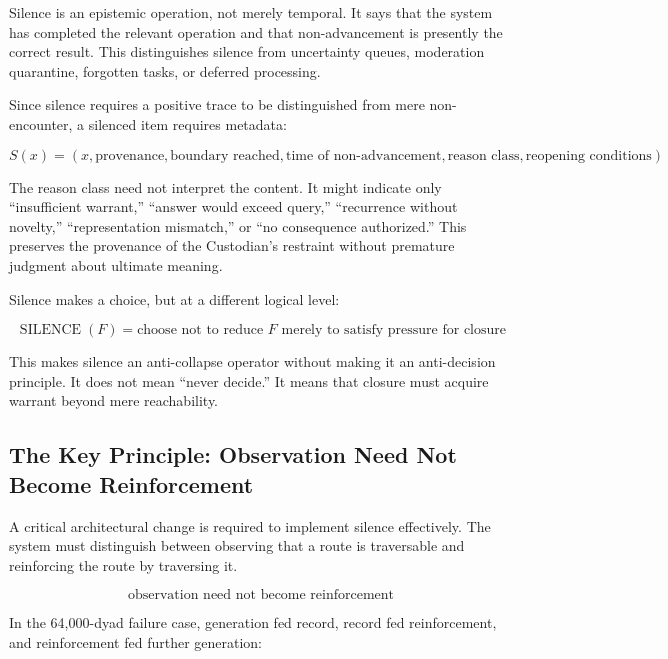 \documentclass[12pt]{article}
\begin{document}
Silence is an epistemic operation, not merely temporal. It says that the system has completed the relevant operation and that non-advancement is presently the correct result. This distinguishes silence from uncertainty queues, moderation quarantine, forgotten tasks, or deferred processing.

Since silence requires a positive trace to be distinguished from mere non-encounter, a silenced item requires metadata:

\begin{equation}
S(x) = \left( x, \text{provenance}, \text{boundary reached}, \text{time of non-advancement}, \text{reason class}, \text{reopening conditions} \right)
\end{equation}

The reason class need not interpret the content. It might indicate only ``insufficient warrant,'' ``answer would exceed query,'' ``recurrence without novelty,'' ``representation mismatch,'' or ``no consequence authorized.'' This preserves the provenance of the Custodian's restraint without premature judgment about ultimate meaning.

Silence makes a choice, but at a different logical level:

\begin{equation}
\boxed{\operatorname{SILENCE}(F) = \text{choose not to reduce } F \text{ merely to satisfy pressure for closure}}
\end{equation}

This makes silence an anti-collapse operator without making it an anti-decision principle. It does not mean ``never decide.'' It means that closure must acquire warrant beyond mere reachability.

\subsection{The Key Principle: Observation Need Not Become Reinforcement}

A critical architectural change is required to implement silence effectively. The system must distinguish between observing that a route is traversable and reinforcing the route by traversing it.

\begin{equation}
\boxed{\text{observation need not become reinforcement}}
\end{equation}

In the 64,000-dyad failure case, generation fed record, record fed reinforcement, and reinforcement fed further generation:
\end{document}
